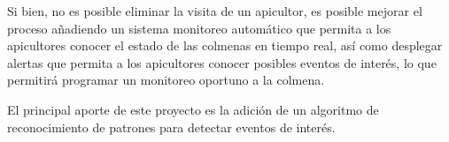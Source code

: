 
Si bien, no es posible eliminar la visita de un apicultor, es posible mejorar el proceso añadiendo un sistema monitoreo automático que permita a los apicultores conocer el estado de las colmenas en tiempo real, así como desplegar alertas que permita a los apicultores conocer posibles eventos de interés, lo que permitirá programar un monitoreo oportuno a la colmena.

El principal aporte de este proyecto es la adición de un algoritmo de reconocimiento de patrones para detectar eventos de interés.
